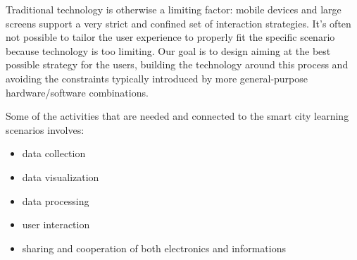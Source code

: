 Traditional technology is otherwise a limiting factor: mobile devices and large screens support a very strict and confined set of interaction strategies. It's often not possible to tailor the user experience to properly fit the specific scenario because technology is too limiting.
Our goal is to design aiming at the best possible strategy for the users, building the technology around this process and avoiding the constraints typically introduced by more general-purpose hardware/software combinations.

Some of the activities that are needed and connected to the smart city learning scenarios involves:

\begin{itemize}
\item data collection
\item data visualization
\item data processing
\item user interaction
\item sharing and cooperation of both electronics and informations
\end{itemize}
